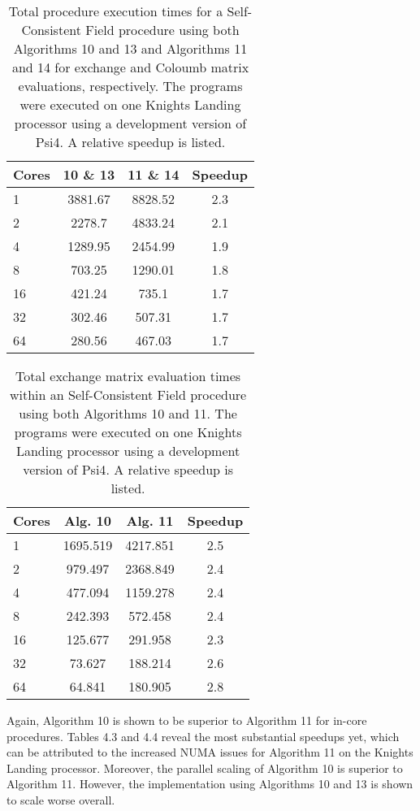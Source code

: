 \begingroup
\begin{table}[H]
\centering
\renewcommand{\baselinestretch}{1}
\caption{Total procedure execution times for a Self-Consistent Field procedure using both Algorithms 10 and 13 and Algorithms 11 and 14 for exchange and Coloumb matrix evaluations, 
    respectively. The programs were executed on one Knights Landing processor
    using a development version of {\sc Psi4}. A relative speedup is listed.}
\begin{tabular}{l ccc}
\multicolumn{1}{l}{\textbf{Cores}} &
\multicolumn{1}{c}{\textbf{10 \& 13}} &
\multicolumn{1}{c}{\textbf{11 \& 14}} &
\multicolumn{1}{c}{\textbf{Speedup}} \\
\hline

1   &3881.67&   8828.52 &2.3 \\
2   &2278.7 &   4833.24 &2.1 \\
4   &1289.95&   2454.99 &1.9 \\
8   &703.25&    1290.01 &1.8 \\
16  &421.24&    735.1   &1.7 \\
32  &302.46&    507.31  &1.7 \\
64  &280.56&    467.03  &1.7 \\

\end{tabular}
\end{table}
\endgroup


\begingroup
\begin{table}[H]
\centering
\renewcommand{\baselinestretch}{1}
\caption{Total exchange matrix evaluation times within an Self-Consistent Field procedure using both Algorithms 10 and 11. The programs were executed on one Knights Landing processor
    using a development version of {\sc Psi4}. A relative speedup is listed.}
\begin{tabular}{l ccc}
\multicolumn{1}{l}{\textbf{Cores}} &
\multicolumn{1}{c}{\textbf{Alg. 10}} &
\multicolumn{1}{c}{\textbf{Alg. 11}} &
\multicolumn{1}{c}{\textbf{Speedup}} \\
\hline

1   &1695.519&  4217.851&   2.5\\
2   & 979.497&  2368.849&   2.4\\
4   & 477.094&  1159.278&   2.4\\
8   & 242.393&   572.458&   2.4\\
16  & 125.677&   291.958&   2.3\\
32  &  73.627&   188.214&   2.6\\
64  &  64.841&   180.905&   2.8\\

\end{tabular}
\end{table}
\endgroup 

Again, Algorithm 10 is shown to be superior to Algorithm 11 for in-core procedures. Tables 4.3 and 4.4 reveal the most substantial speedups yet, which can be attributed
to the increased NUMA issues for Algorithm 11 on the Knights Landing processor. Moreover, the parallel scaling of  Algorithm 10 is superior to Algorithm 11. However,
the implementation using Algorithms 10 and 13 is shown to scale worse overall.  


